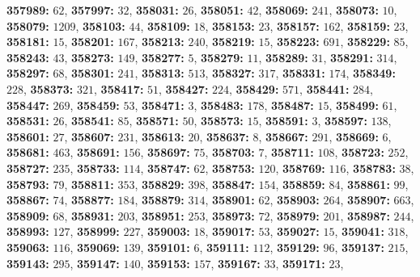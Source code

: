 \textsf{\bfseries 357989:} $62$, \textsf{\bfseries 357997:} $32$, \textsf{\bfseries 358031:} $26$, \textsf{\bfseries 358051:} $42$, \textsf{\bfseries 358069:} $241$, \textsf{\bfseries 358073:} $10$, \textsf{\bfseries 358079:} $1209$, \textsf{\bfseries 358103:} $44$, \textsf{\bfseries 358109:} $18$, \textsf{\bfseries 358153:} $23$, \textsf{\bfseries 358157:} $162$, \textsf{\bfseries 358159:} $23$, \textsf{\bfseries 358181:} $15$, \textsf{\bfseries 358201:} $167$, \textsf{\bfseries 358213:} $240$, \textsf{\bfseries 358219:} $15$, \textsf{\bfseries 358223:} $691$, \textsf{\bfseries 358229:} $85$, \textsf{\bfseries 358243:} $43$, \textsf{\bfseries 358273:} $149$, \textsf{\bfseries 358277:} $5$, \textsf{\bfseries 358279:} $11$, \textsf{\bfseries 358289:} $31$, \textsf{\bfseries 358291:} $314$, \textsf{\bfseries 358297:} $68$, \textsf{\bfseries 358301:} $241$, \textsf{\bfseries 358313:} $513$, \textsf{\bfseries 358327:} $317$, \textsf{\bfseries 358331:} $174$, \textsf{\bfseries 358349:} $228$, \textsf{\bfseries 358373:} $321$, \textsf{\bfseries 358417:} $51$, \textsf{\bfseries 358427:} $224$, \textsf{\bfseries 358429:} $571$, \textsf{\bfseries 358441:} $284$, \textsf{\bfseries 358447:} $269$, \textsf{\bfseries 358459:} $53$, \textsf{\bfseries 358471:} $3$, \textsf{\bfseries 358483:} $178$, \textsf{\bfseries 358487:} $15$, \textsf{\bfseries 358499:} $61$, \textsf{\bfseries 358531:} $26$, \textsf{\bfseries 358541:} $85$, \textsf{\bfseries 358571:} $50$, \textsf{\bfseries 358573:} $15$, \textsf{\bfseries 358591:} $3$, \textsf{\bfseries 358597:} $138$, \textsf{\bfseries 358601:} $27$, \textsf{\bfseries 358607:} $231$, \textsf{\bfseries 358613:} $20$, \textsf{\bfseries 358637:} $8$, \textsf{\bfseries 358667:} $291$, \textsf{\bfseries 358669:} $6$, \textsf{\bfseries 358681:} $463$, \textsf{\bfseries 358691:} $156$, \textsf{\bfseries 358697:} $75$, \textsf{\bfseries 358703:} $7$, \textsf{\bfseries 358711:} $108$, \textsf{\bfseries 358723:} $252$, \textsf{\bfseries 358727:} $235$, \textsf{\bfseries 358733:} $114$, \textsf{\bfseries 358747:} $62$, \textsf{\bfseries 358753:} $120$, \textsf{\bfseries 358769:} $116$, \textsf{\bfseries 358783:} $38$, \textsf{\bfseries 358793:} $79$, \textsf{\bfseries 358811:} $353$, \textsf{\bfseries 358829:} $398$, \textsf{\bfseries 358847:} $154$, \textsf{\bfseries 358859:} $84$, \textsf{\bfseries 358861:} $99$, \textsf{\bfseries 358867:} $74$, \textsf{\bfseries 358877:} $184$, \textsf{\bfseries 358879:} $314$, \textsf{\bfseries 358901:} $62$, \textsf{\bfseries 358903:} $264$, \textsf{\bfseries 358907:} $663$, \textsf{\bfseries 358909:} $68$, \textsf{\bfseries 358931:} $203$, \textsf{\bfseries 358951:} $253$, \textsf{\bfseries 358973:} $72$, \textsf{\bfseries 358979:} $201$, \textsf{\bfseries 358987:} $244$, \textsf{\bfseries 358993:} $127$, \textsf{\bfseries 358999:} $227$, \textsf{\bfseries 359003:} $18$, \textsf{\bfseries 359017:} $53$, \textsf{\bfseries 359027:} $15$, \textsf{\bfseries 359041:} $318$, \textsf{\bfseries 359063:} $116$, \textsf{\bfseries 359069:} $139$, \textsf{\bfseries 359101:} $6$, \textsf{\bfseries 359111:} $112$, \textsf{\bfseries 359129:} $96$, \textsf{\bfseries 359137:} $215$, \textsf{\bfseries 359143:} $295$, \textsf{\bfseries 359147:} $140$, \textsf{\bfseries 359153:} $157$, \textsf{\bfseries 359167:} $33$, \textsf{\bfseries 359171:} $23$, 
